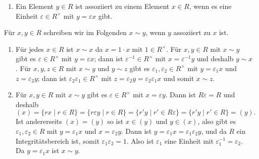 \begin{solution}
  \begin{enumerate}
    \item
      Ein Element $y \in R$ ist assoziiert zu einem Element $x \in R$, wenn es eine Einheit $\varepsilon \in R^\times$ mit $y = \varepsilon x$ gibt.
  \end{enumerate}
  Für $x, y \in R$ schreiben wir im Folgenden $x \sim y$, wenn $y$ assoziiert zu $x$ ist.
  \begin{enumerate}[resume]
    \item
      Für jedes $x \in R$ ist $x \sim x$ da $x = 1 \cdot x$ mit $1 \in R^\times$.
      Für $x, y \in R$ mit $x \sim y$ gibt es $\varepsilon \in R^\times$ mit $y = \varepsilon x$;
      dann ist $\varepsilon^{-1} \in R^\times$ mit $x = \varepsilon^{-1} y$ und deshalb $y \sim x$.
      Für $x, y, z \in R$ mit $x \sim y$ und $y \sim z$ gibt es $\varepsilon_1, \varepsilon_2 \in R^\times$ mit $y = \varepsilon_1 x$ und $z = \varepsilon_2 y$;
      dann ist $\varepsilon_2 \varepsilon_1 \in R^\times$ mit $z = \varepsilon_2 y = \varepsilon_2 \varepsilon_1 x$ und somit $x \sim z$.
    \item
      Für $x, y \in R$ mit $x \sim y$ gibt es $\varepsilon \in R^\times$ mit $x = \varepsilon y$.
      Dann ist $R \varepsilon = R$ und deshalb
      \[
          (x)
        = \{r x \mid r \in R\}
        = \{r \varepsilon y \mid r \in R\}
        = \{r' y \mid r' \in R \varepsilon\}
        = \{r' y \mid r' \in R\}
        = (y).
      \]
      Ist andererseits $(x) = (y)$ so ist $x \in (y)$ und $y \in (x)$, also gibt es $\varepsilon_1, \varepsilon_2 \in R$ mit $y = \varepsilon_1 x$ und $x = \varepsilon_2 y$.
      Dann ist $y = \varepsilon_1 x = \varepsilon_1 \varepsilon_2 y$, und da $R$ ein Integritätsbereich ist, somit $\varepsilon_1 \varepsilon_2 = 1$.
      Also ist $\varepsilon_1$ eine Einheit mit $\varepsilon_1^{-1} = \varepsilon_2$.
      Da $y = \varepsilon_1 x$ ist $x \sim y$.
  \end{enumerate}
\end{solution}


